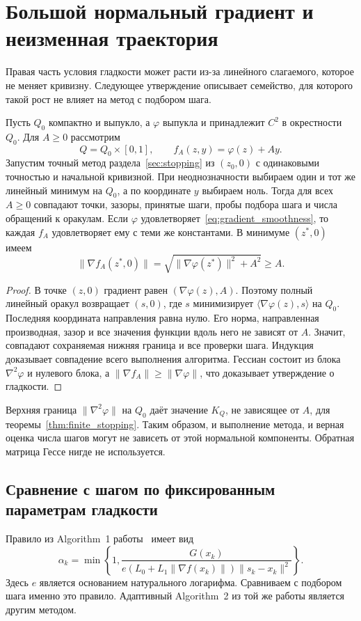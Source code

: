 \section{Большой нормальный градиент и неизменная траектория}
\label{sec:normal}
Правая часть условия гладкости может расти из-за линейного слагаемого,
которое не меняет кривизну. Следующее утверждение описывает семейство,
для которого такой рост не влияет на метод с подбором шага.

\begin{proposition}
\label{prop:normal_invariance}
Пусть $Q_0$ компактно и выпукло, а $\varphi$ выпукла и принадлежит
$C^2$ в окрестности $Q_0$. Для $A\ge0$ рассмотрим
\[
 Q=Q_0\times[0,1],\qquad f_A(z,y)=\varphi(z)+Ay.
\]
Запустим точный метод раздела~\ref{sec:stopping} из $(z_0,0)$ с
одинаковыми точностью и начальной кривизной. При неоднозначности
выбираем один и тот же линейный минимум на $Q_0$, а по координате $y$
выбираем ноль. Тогда для всех $A\ge0$ совпадают точки, зазоры,
принятые шаги, пробы подбора шага и числа обращений к оракулам.
Если $\varphi$ удовлетворяет~\eqref{eq:gradient_smoothness}, то
каждая $f_A$ удовлетворяет ему с теми же константами. В минимуме
$(z^*,0)$ имеем
\[
 \|\nabla f_A(z^*,0)\|
   =\sqrt{\|\nabla\varphi(z^*)\|^2+A^2}\ge A.
\]
\end{proposition}
\begin{proof}
В точке $(z,0)$ градиент равен $(\nabla\varphi(z),A)$. Поэтому полный
линейный оракул возвращает $(s,0)$, где $s$ минимизирует
$\langle\nabla\varphi(z),s\rangle$ на $Q_0$.
Последняя координата направления равна нулю. Его норма, направленная
производная, зазор и все значения функции вдоль него не зависят от $A$.
Значит, совпадают сохраняемая нижняя граница и все проверки шага.
Индукция доказывает совпадение всего выполнения алгоритма.
Гессиан состоит из блока $\nabla^2\varphi$ и нулевого блока, а
$\|\nabla f_A\|\ge\|\nabla\varphi\|$, что доказывает утверждение о
гладкости.
\end{proof}

Верхняя граница $\|\nabla^2\varphi\|$ на $Q_0$ даёт значение $K_Q$,
не зависящее от $A$, для теоремы~\ref{thm:finite_stopping}.
Таким образом, и выполнение метода, и верная оценка числа шагов
могут не зависеть от этой нормальной компоненты.
Обратная матрица Гессе нигде не используется.

\subsection{Сравнение с шагом по фиксированным параметрам гладкости}
Правило из Algorithm~1 работы~\cite{vyguzov} имеет вид
\begin{equation}\label{eq:vyguzov_step}
 \alpha_k=\min\left\{1,
 \frac{G(x_k)}{e(L_0+L_1\|\nabla f(x_k)\|)\|s_k-x_k\|^2}
 \right\}.
\end{equation}
Здесь $e$ является основанием натурального логарифма. Сравниваем с
подбором шага именно это правило. Адаптивный Algorithm~2 из той же
работы является другим методом.

